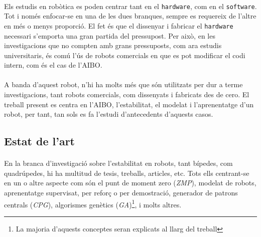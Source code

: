 \documentclass[12pt,a4paper,final,twoside]{article}
\begin{document}
\paragraph{}Els estudis en robòtica es poden centrar tant en el \texttt{hardware}, com en el \texttt{software}. Tot i només enfocar-se en una de les dues branques, sempre es requereix de l'altre en més o menys proporció. El fet és que el dissenyar i fabricar el \texttt{hardware} necessari s'emporta una gran partida del pressupost. Per això, en les investigacions que no compten amb grans pressuposts, com ara estudis universitaris, és comú l'ús de robots comercials en que es pot modificar el codi intern, com és el cas de l'AIBO.

\paragraph{}A banda d'aquest robot, n'hi ha molts més que són utilitzats per dur a terme investigacions, tant robots comercials, com dissenyats i fabricats des de cero. El treball present es centra en l'AIBO, l'estabilitat, el modelat i l'aprenentatge d'un robot, per tant, tan sols es fa l'estudi d'antecedents d'aquests casos.


\subsection*{Estat de l'art}

\paragraph{}En la branca d'investigació sobre l'estabilitat en robots, tant bípedes, com quadrúpedes, hi ha multitud de tesis, treballs, articles, etc. Tots ells centrant-se en un o altre aspecte com són el punt de moment zero (\textit{ZMP}), modelat de robots, aprenentatge supervisat, per reforç o per demostració, generador de patrons centrals (\textit{CPG}), algorismes genètics (\textit{GA})\footnote{La majoria d'aquests conceptes seran explicats al llarg del treball}, i molts altres.
\end{document}
